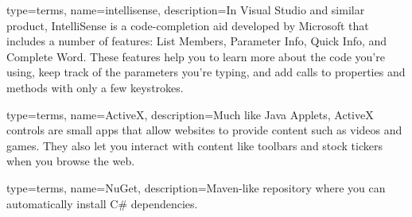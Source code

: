 {
    type={terms},
    name={intellisense},
    description={In Visual Studio and similar product, IntelliSense is a code-completion aid developed by Microsoft that includes a number of features: List Members, Parameter Info, Quick Info, and Complete Word. These features help you to learn more about the code you're using, keep track of the parameters you're typing, and add calls to properties and methods with only a few keystrokes.\cite{intellisense:2020}}
}

{
    type={terms},
    name={ActiveX},
    description={Much like Java Applets, ActiveX controls are small apps that allow websites to provide content such as videos and games. They also let you interact with content like toolbars and stock tickers when you browse the web.\cite{activeX}}
}

{
    type={terms},
    name={NuGet},
    description={Maven-like repository where you can automatically install C\# dependencies.}
}


